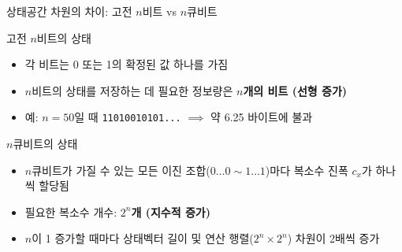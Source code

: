 \documentclass[aspectratio=169, 10pt]{beamer}
\begin{document}
\begin{frame}{상태공간 차원의 차이: 고전 $n$비트 vs $n$큐비트}
    \begin{qcblock}{고전 $n$비트의 상태}
        \begin{itemize}
            \item 각 비트는 0 또는 1의 확정된 값 하나를 가짐
            \pause
            \item $n$비트의 상태를 저장하는 데 필요한 정보량은 \textbf{$n$개의 비트 (선형 증가)}
            \pause
            \item 예: $n=50$일 때 \texttt{11010010101...} $\implies$ 약 6.25 바이트에 불과
        \end{itemize}
    \end{qcblock}
    \pause
    \vspace{0.2cm}
    \begin{qcalert}{$n$큐비트의 상태}
        \begin{itemize}
            \item $n$큐비트가 가질 수 있는 모든 이진 조합($0\dots0 \sim 1\dots1$)마다 복소수 진폭 $c_x$가 하나씩 할당됨
            \pause
            \item 필요한 복소수 개수: \textbf{$2^n$개 (지수적 증가)}
            \pause
            \item $n$이 1 증가할 때마다 상태벡터 길이 및 연산 행렬($2^n \times 2^n$) 차원이 2배씩 증가
        \end{itemize}
    \end{qcalert}
\end{frame}
\end{document}
